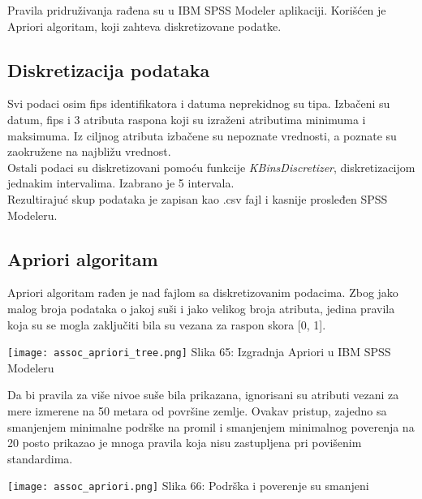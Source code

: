 \documentclass[a4paper]{article}
\begin{document}
{Pravila pridruživanja rađena su u IBM SPSS Modeler aplikaciji. Korišćen je Apriori algoritam, koji zahteva diskretizovane podatke.

\subsection{Diskretizacija podataka}
\label{diskretizacija}

Svi podaci osim fips identifikatora i datuma neprekidnog su tipa. Izbačeni su datum, fips i 3 atributa raspona koji su izraženi atributima minimuma i maksimuma. Iz ciljnog atributa izbačene su nepoznate vrednosti, a poznate su zaokružene na najbližu vrednost.\\

Ostali podaci su diskretizovani pomoću funkcije {\em KBinsDiscretizer}, diskretizacijom jednakim intervalima. Izabrano je 5 intervala.\\

Rezultirajuć skup podataka je zapisan kao .csv fajl i kasnije prosleđen SPSS Modeleru.

\subsection{Apriori algoritam}
\label{apriori}

Apriori algoritam rađen je nad fajlom sa diskretizovanim podacima. Zbog jako malog broja podataka o jakoj suši i jako velikog broja atributa, jedina pravila koja su se mogla zaključiti bila su vezana za raspon skora [0, 1].\\

\noindent\begin{minipage}{1.0\textwidth}
\texttt{[image: assoc\_apriori\_tree.png]}
\hphantom{aaaaaaaaaaa}Slika 65: Izgradnja Apriori u IBM SPSS Modeleru\\
\end{minipage}

Da bi pravila za više nivoe suše bila prikazana, ignorisani su atributi vezani za mere izmerene na 50 metara od površine zemlje. Ovakav pristup, zajedno sa smanjenjem minimalne podrške na promil i smanjenjem minimalnog poverenja na 20 posto prikazao je mnoga pravila koja nisu zastupljena pri povišenim standardima.\\

\noindent\begin{minipage}{1.0\textwidth}
\texttt{[image: assoc\_apriori.png]}
\hphantom{aaaaaaaaaaaaaaaaaa}Slika 66: Podrška i poverenje su smanjeni\\
\end{minipage}

}
\end{document}
